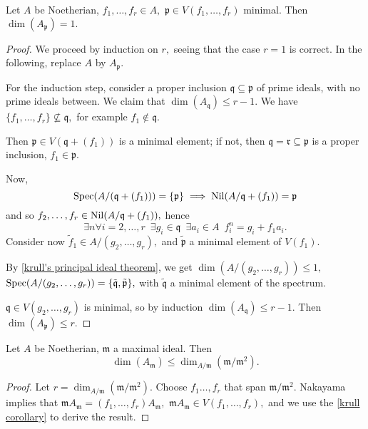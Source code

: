 \begin{corollary}
  \label{krull corollary}
  Let \(A\) be Noetherian,
  \(f_1, \dotsc, f_r \in A,\)
  \(\mathfrak p \in V(f_1, \dotsc, f_r)\) minimal.
  Then
  \(\dim(A_{\mathfrak p}) = 1.\)
\end{corollary}
\begin{proof}
  We proceed by induction on \(r,\) seeing that the case \(r=1\) is correct. In the following, replace \(A\) by \(A_{\mathfrak p}.\)

  For the induction step, consider a proper inclusion \(\mathfrak q \subseteq \mathfrak p\) of prime ideals, with no prime ideals between. We claim that \(\dim(A_{\mathfrak q}) \leq r-1.\)
  We have
  \(\{f_1, \dotsc, f_r\} \not\subseteq \mathfrak q,\)
  for example \(f_1 \notin \mathfrak q.\)

  Then \(\mathfrak p \in V(\mathfrak q + (f_1))\) is a  minimal element; if not, then \(\mathfrak q = \mathfrak r \subseteq \mathfrak p\) is a proper inclusion, \(f_1 \in \mathfrak p.\)

  Now,
  \[\text{Spec}(A/{(\mathfrak q + (f_1))}) = \{\mathfrak p\} \implies \operatorname{Nil}(A / {\mathfrak q + (f_1)}) = \mathfrak p\]
  and so \(f_2, \dotsc, f_r \in \operatorname{Nil}(A/{\mathfrak q + (f_1)}),\) hence
  \[\exists n \forall i = 2, \dotsc, r \enspace \exists g_i \in \mathfrak q \enspace \exists a_i \in A \enspace f_i^n = g_i + f_1 a_i.\]
  Consider now \(\tilde{f}_1 \in A/{(g_2, \dotsc, g_r)},\) and \(\tilde{\mathfrak p}\) a minimal element of \(V(f_1).\)

  By \cref{krull's principal ideal theorem}, we get
  \(\dim(A/{(g_2, \dotsc, g_r)}) \leq 1,\)
  \(\text{Spec}(A/{(g_2, \dotsc, g_r)}) = \{\tilde{\mathfrak q}, \tilde{\mathfrak p}\},\)
  with \(\tilde{\mathfrak q}\) a minimal element of the spectrum.

  \(\mathfrak q \in V(g_2, \dotsc, g_r)\) is minimal, so by induction \(\dim(A_{\mathfrak q}) \leq r - 1.\) Then \(\dim(A_{\mathfrak p}) \leq r.\)
\end{proof}

\begin{corollary}
  Let \(A\) be Noetherian, \(\mathfrak m\) a maximal ideal. Then
  \[\dim(A_{\mathfrak m}) \leq \dim_{A/{\mathfrak m}}(\mathfrak m /{\mathfrak m^2}).\]
\end{corollary}
\begin{proof}
  Let \(r = \dim_{A/{\mathfrak m}}(\mathfrak m /{\mathfrak m^2}).\) Choose \(f_1 \dotsc, f_r\) that span \(\mathfrak m /{\mathfrak m^2}\). Nakayama implies that
  \(\mathfrak m A_{\mathfrak m} = (f_1, \dotsc, f_r) A_{\mathfrak m},\)
  \(\mathfrak m A_{\mathfrak m} \in V(f_1, \dotsc, f_r),\)
  and we use the \cref{krull corollary} to derive the result.
\end{proof}

